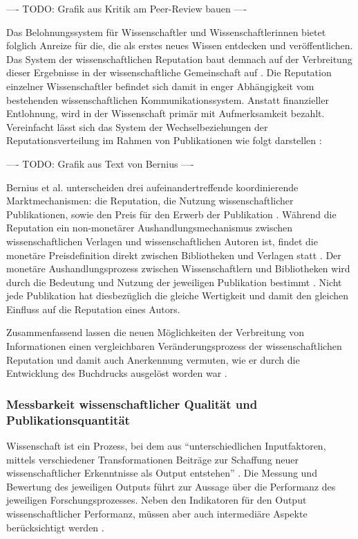 ---- TODO: Grafik aus Kritik am Peer-Review bauen \cite{mueller_2009_peerreview} ----

Das Belohnungssystem für Wissenschaftler und Wissenschaftlerinnen bietet folglich Anreize für die, die als erstes neues Wissen entdecken und veröffentlichen. Das System der wissenschaftlichen Reputation baut demnach auf der Verbreitung dieser Ergebnisse in der wissenschaftliche Gemeinschaft auf \cite{Fabrizio_2008}. Die Reputation einzelner Wissenschaftler befindet sich damit in enger Abhängigkeit vom bestehenden wissenschaftlichen Kommunikationssystem. Anstatt finanzieller Entlohnung, wird in der Wissenschaft primär mit Aufmerksamkeit bezahlt. Vereinfacht lässt sich das System der Wechselbeziehungen der Reputationsverteilung im Rahmen von Publikationen wie folgt darstellen \cite{cite:21a}:

---- TODO: Grafik aus Text von Bernius ----

Bernius et al. unterscheiden drei aufeinandertreffende koordinierende Marktmechanismen: die Reputation, die Nutzung wissenschaftlicher Publikationen, sowie den Preis für den Erwerb der Publikation \cite{cite:21a}. Während die Reputation ein non-monetärer Aushandlungsmechanismus zwischen wissenschaftlichen Verlagen und wissenschaftlichen Autoren ist, findet die monetäre Preisdefinition direkt zwischen Bibliotheken und Verlagen statt \cite{EuropeanCommission_sciencepub_2006}. Der monetäre Aushandlungsprozess zwischen Wissenschaftlern und Bibliotheken wird durch die Bedeutung und Nutzung der jeweiligen Publikation bestimmt \cite{cite:21a}. Nicht jede Publikation hat diesbezüglich die gleiche Wertigkeit \cite{suchen} und damit den gleichen Einfluss auf die Reputation eines Autors.

Zusammenfassend lassen die neuen Möglichkeiten der Verbreitung von Informationen einen vergleichbaren Veränderungsprozess der wissenschaftlichen Reputation und damit auch Anerkennung vermuten, wie er durch die Entwicklung des Buchdrucks ausgelöst worden war \cite{hanekop_2006}.

\subsubsection{Messbarkeit wissenschaftlicher Qualität und Publikationsquantität}

Wissenschaft ist ein Prozess, bei dem aus “unterschiedlichen Inputfaktoren, mittels verschiedener Transformationen Beiträge zur Schaffung neuer wissenschaftlicher Erkenntnisse als Output entstehen” \cite{Jansen_2007}. Die Messung und Bewertung des jeweiligen Outputs führt zur Aussage über die Performanz des jeweiligen Forschungsprozesses. Neben den Indikatoren für den Output wissenschaftlicher Performanz, müssen aber auch intermediäre Aspekte berücksichtigt werden \cite{schmoch_2009}.

